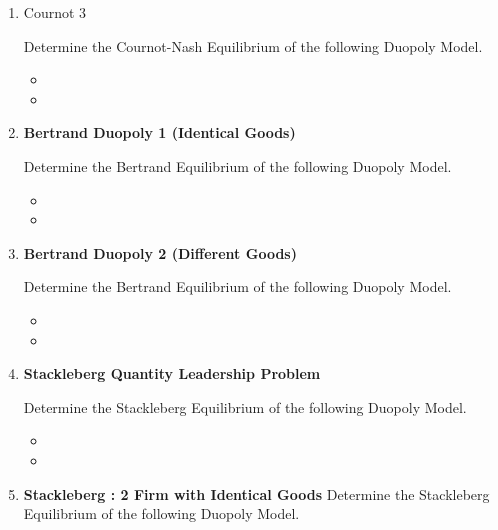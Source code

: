 \documentclass[]{report}
\begin{document}
\begin{enumerate}
\begin{itemize}
\end{itemize}
\item Cournot 3

Determine the Cournot-Nash Equilibrium of the following Duopoly Model.

\begin{itemize}
	
	\item
	
	\item
	
\end{itemize}

\item \textbf{Bertrand Duopoly 1 (Identical Goods)}


Determine the Bertrand Equilibrium of the following Duopoly Model.

\begin{itemize}
	
	\item
	
	\item
	
\end{itemize}
\item \textbf{Bertrand Duopoly 2 (Different Goods)}


Determine the Bertrand Equilibrium of the following Duopoly Model.

\begin{itemize}
	
	\item
	
	\item
	
\end{itemize}
\item \textbf{Stackleberg Quantity Leadership Problem}


Determine the Stackleberg Equilibrium of the following Duopoly Model.

\begin{itemize}
	
	\item
	
	\item
	
\end{itemize}

\item \textbf{Stackleberg : 2 Firm with Identical Goods}
Determine the Stackleberg Equilibrium of the following Duopoly Model.




\end{enumerate}
\end{document}
